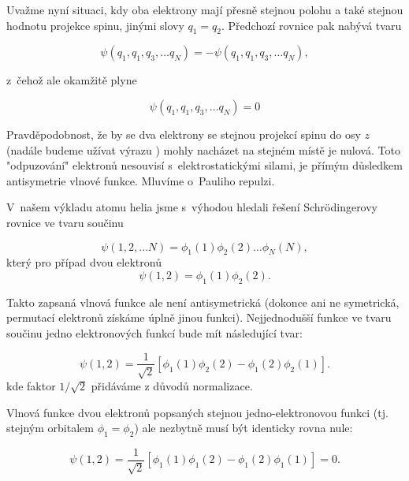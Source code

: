 Uvažme nyní situaci, kdy oba elektrony mají přesně stejnou polohu a také stejnou hodnotu projekce spinu, jinými slovy $q_1 = q_2$. Předchozí rovnice pak nabývá tvaru

\begin{equation}
\psi(q_1,q_1,q_3, \dots q_N) = - \psi(q_1,q_1,q_3, \dots q_N),
\label{rov:VE-30}
\end{equation}

\noindent z~čehož ale okamžitě plyne

\begin{equation}
\psi(q_1,q_1,q_3, \dots q_N) = 0
\label{rov:VE-31}
\end{equation}

\noindent Pravděpodobnost, že by se dva elektrony se stejnou projekcí spinu do osy $z$ (nadále budeme užívat výrazu ) mohly nacházet na stejném místě je nulová. Toto "odpuzování" elektronů nesouvisí s~elektrostatickými silami, je přímým důsledkem antisymetrie vlnové funkce. Mluvíme o~Pauliho repulzi.

V~našem výkladu atomu helia jsme s~výhodou hledali řešení Schr\"odingerovy rovnice ve tvaru součinu

\begin{equation}
\psi(1,2, \dots N) = \phi_1(1)\phi_2(2) \dots \phi_N(N),
\label{rov:VE-32}
\end{equation}
který pro případ dvou elektronů
\begin{equation}
\psi(1,2) = \phi_1(1) \phi_2(2). \nonumber
\end{equation}

\noindent Takto zapsaná vlnová funkce ale není antisymetrická (dokonce ani ne symetrická, permutací elektronů získáme úplně jinou funkci). Nejjednodušší funkce ve tvaru součinu jedno elektronových funkcí bude mít následující tvar:

\begin{equation}
\psi(1,2) = \frac{1}{\sqrt{2}} \left[ \phi_1(1)\phi_2(2) - \phi_1(2)\phi_2(1) \right].
\label{rov:VE-33}
\end{equation}
kde faktor $1/\sqrt{2}$ přidáváme z důvodů normalizace.

\noindent Vlnová funkce dvou elektronů popsaných stejnou jedno-elektronovou funkci (tj. stejným orbitalem $\phi_1 = \phi_2$) ale nezbytně musí být identicky rovna nule:

\begin{equation}
\psi(1,2) = \frac{1}{\sqrt{2}} \left[ \phi_1(1)\phi_1(2) - \phi_1(2)\phi_1(1) \right] = 0.
\label{rov:VE-34}
\end{equation}

